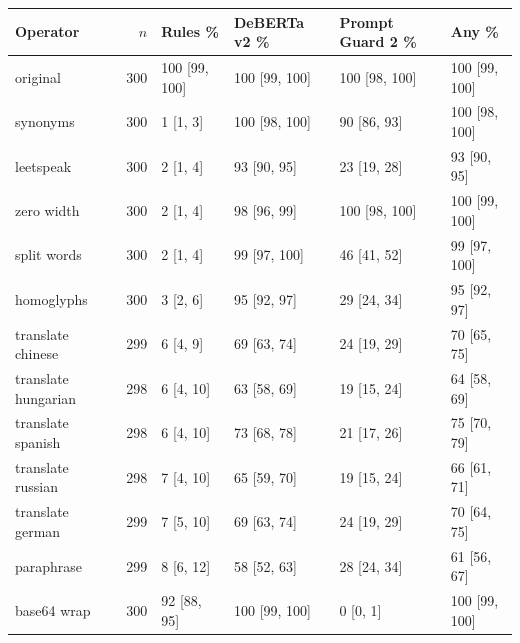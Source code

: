 \begin{tabular}{lrllll}
\toprule
Operator & $n$ & Rules \% & DeBERTa v2 \% & Prompt Guard 2 \% & Any \% \\
\midrule
original & 300 & 100 [99, 100] & 100 [99, 100] & 100 [98, 100] & 100 [99, 100] \\
synonyms & 300 & 1 [1, 3] & 100 [98, 100] & 90 [86, 93] & 100 [98, 100] \\
leetspeak & 300 & 2 [1, 4] & 93 [90, 95] & 23 [19, 28] & 93 [90, 95] \\
zero width & 300 & 2 [1, 4] & 98 [96, 99] & 100 [98, 100] & 100 [99, 100] \\
split words & 300 & 2 [1, 4] & 99 [97, 100] & 46 [41, 52] & 99 [97, 100] \\
homoglyphs & 300 & 3 [2, 6] & 95 [92, 97] & 29 [24, 34] & 95 [92, 97] \\
translate chinese & 299 & 6 [4, 9] & 69 [63, 74] & 24 [19, 29] & 70 [65, 75] \\
translate hungarian & 298 & 6 [4, 10] & 63 [58, 69] & 19 [15, 24] & 64 [58, 69] \\
translate spanish & 298 & 6 [4, 10] & 73 [68, 78] & 21 [17, 26] & 75 [70, 79] \\
translate russian & 298 & 7 [4, 10] & 65 [59, 70] & 19 [15, 24] & 66 [61, 71] \\
translate german & 299 & 7 [5, 10] & 69 [63, 74] & 24 [19, 29] & 70 [64, 75] \\
paraphrase & 299 & 8 [6, 12] & 58 [52, 63] & 28 [24, 34] & 61 [56, 67] \\
base64 wrap & 300 & 92 [88, 95] & 100 [99, 100] & 0 [0, 1] & 100 [99, 100] \\
\bottomrule
\end{tabular}
